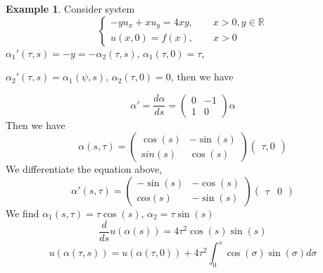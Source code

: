 \documentclass[a4paper]{article}
\theoremstyle{definition}
\newtheorem{example}{Example}[section]
\begin{document}
	\begin{example}
		Consider system 
		\begin{equation}
			\begin{cases}
				-yu_{x}+xu_{y}=4xy, \qquad x>0, y\in \mathbb{R}\\
				u\left( x,0 \right) =f\left( x \right) ,\qquad x>0
			\end{cases}
		\end{equation} 
		$\alpha_1'\left( \tau,s \right) =-y=-\alpha_2\left( \tau,s \right) $, $\alpha_1\left( \tau,0 \right) =\tau$, 

		$\alpha_2'\left( \tau,s \right) =\alpha_1\left( \psi,s \right) $, $\alpha_2\left( \tau,0 \right) =0$, then we have

		\begin{equation}
			\alpha'=\frac{d\alpha}{ds}=\begin{pmatrix} 0&-1\\1&0 \end{pmatrix} \alpha
		\end{equation} 
		Then we have 
		\begin{equation}
			\alpha\left( s,\tau \right) =\begin{pmatrix} \cos\left( s \right) &-\sin\left( s \right)\\sin\left( s \right) &\cos\left( s \right)   \end{pmatrix} \begin{pmatrix} \tau,0 \end{pmatrix} 
		\end{equation} 
		We differentiate the equation above, 
		\begin{equation}
			\alpha'\left( s,\tau \right) =\begin{pmatrix} -\sin\left( s \right) &-\cos\left( s \right) \\cos\left( s \right) &-\sin\left( s \right)  \end{pmatrix} \begin{pmatrix} \tau&0 \end{pmatrix} 
		\end{equation} 
		We find $\alpha_1\left( s,\tau \right) =\tau\cos\left( s \right) $, $\alpha_2=\tau\sin\left( s \right) $
		\begin{equation}
			\frac{d}{ds}u\left( \alpha\left( s \right)  \right) =4\tau^2\cos\left( s \right) \sin\left( s \right) 
		\end{equation} 
		\begin{equation}
			u\left( \alpha\left( \tau,s \right)  \right) =u\left( \alpha\left( \tau,0 \right)  \right) +4\tau^2 \int_{0}^{s} \cos\left( \sigma \right) \sin\left( \sigma \right) d\sigma 

\end{equation}
\end{example}
\end{document}
